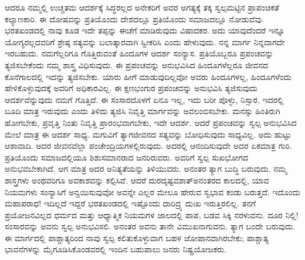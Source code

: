 ಆದರೂ ನಮ್ಮಲ್ಲಿ ಉಚ್ಚತಮ ಆದರ್ಶಕ್ಕೆ ಸಿದ್ಧರಲ್ಲದ ಅನೇಕರಿಗೆ ಅವರ ಅಗತ್ಯಕ್ಕೆ ತಕ್ಕ ಸ್ವಲ್ಪಮಟ್ಟಿನ ಪ್ರಾಪಂಚಿಕತೆ ಕಲ್ಯಾಣಕಾರಿ. ಈ ದೋಷವನ್ನು ಪ್ರತಿಯೊಂದು ದೇಶದಲ್ಲೂ ಪ್ರತಿಯೊಂದು ಸಮಾಜದಲ್ಲೂ ನೋಡುವೆವು. ಭರತಖಂಡದಲ್ಲಿ ನಾವು ಕೂಡ ಇದೇ ತಪ್ಪನ್ನು ಈಚೆಗೆ ಮಾಡಿರುವುದು ವಿಷಾದಕರ. ಅದು ಯಾವುದೆಂದರೆ ಇನ್ನೂ ಯೋಗ್ಯರಲ್ಲದವರಿಗೆ ಶ್ರೇಷ್ಠ ಸತ್ಯವನ್ನು ಬಲಾತ್ಕಾರವಾಗಿ ಸ್ವೀಕರಿಸಿ ಎಂದು ಹೇಳುವುದು. ನನ್ನ ಮಾರ್ಗ ನಿನ್ನದಾಗದೇ ಇರಬಹುದು. ನಮಗೆಲ್ಲರಿಗೂ ಗೊತ್ತಿರುವಂತೆ ಹಿಂದೂಗಳ ಆದರ್ಶ ಸಂನ್ಯಾಸ. ಪ್ರತಿಯೊಬ್ಬರೂ ಪ್ರಪಂಚವನ್ನು ತ್ಯಜಿಸಬೇಕೆಂದು ನಮ್ಮ ಶಾಸ್ತ್ರ ವಿಧಿಸುವುದು. ಈ ಪ್ರಪಂಚವನ್ನು ಅನುಭವಿಸಿದ ಹಿಂದೂಗಳೆಲ್ಲರೂ ಜೀವನದ ಕೊನೆಗಾಲದಲ್ಲಿ ಇದನ್ನು ತ್ಯಜಿಸಬೇಕು. ಯಾರು ಹೀಗೆ ಮಾಡುವುದಿಲ್ಲವೋ ಅವರು ಹಿಂದೂಗಳಲ್ಲ, ಹಿಂದೂಗಳೆಂದು ಹೇಳಿಕೊಳ್ಳುವುದಕ್ಕೆ ಅವರಿಗೆ ಅಧಿಕಾರವಿಲ್ಲ. ಈ ಕ್ಷಣಭಂಗುರ ಪ್ರಪಂಚವನ್ನು ಅನುಭವಿಸಿ ತ್ಯಜಿಸುವುದು ಆದರ್ಶವೆನ್ನುವುದು ನಮಗೆ ಗೊತ್ತಿದೆ. ಈ ಸಂಸಾರದೊಳಗೆ ಏನೂ ಇಲ್ಲ, ಇದು ಬರೀ ಪೊಳ್ಳು, ನಿಸ್ಸಾರ, ಇದರಲ್ಲಿ ಬೂದಿ ಮಾತ್ರ ಇರುವುದು ಎಂದು ತಿಳಿದು ತ್ಯಜಿಸಿ ನಿವೃತ್ತಿ ಮಾರ್ಗವನ್ನು ಅವಲಂಬಿಸಬೇಕು. ಮನಸ್ಸು ಹಿಂತಿರುಗಿ ಹೋಗಬೇಕು, ಪ್ರವೃತ್ತಿ ನಿಂತು ನಿವೃತ್ತಿ ಪ್ರಾರಂಭವಾಗಬೇಕು, ಇದೇ ಆದರ್ಶ. ಆದರೆ ಪ್ರಪಂಚವನ್ನು ಸ್ವಲ್ಪ ಅನುಭವಿಸಿದ ಮೇಲೆ ಮಾತ್ರ ಈ ಆದರ್ಶ ಸಾಧ್ಯ. ಮಗುವಿಗೆ ತ್ಯಾಗಜೀವನದ ಸತ್ಯವನ್ನು ಬೋಧಿಸುವುದು ಸಾಧ್ಯವಿಲ್ಲ. ಅದು ಹುಟ್ಟು ಆಶಾವಾದಿ. ಅದರ ಜೀವನವೆಲ್ಲಾ ಪಂಚೇಂದ್ರಿಯಗಳಲ್ಲಿರುವುದು. ಅದರಲ್ಲಿ ಆನಂದಿಸುವುದೇ ಅದರ ಏಕಮಾತ್ರ ಗುರಿ. ಪ್ರತಿಯೊಂದು ಸಮಾಜದಲ್ಲಿಯೂ ಶಿಶುಸಮಾನರಾದ ಜನರಿರುವರು. ಅವರಿಗೆ ಸ್ವಲ್ಪ ಸುಖಭೋಗದ ಅನುಭವಬೇಕಾಗಿದೆ. ಆಗ ಮಾತ್ರ ಅದರ ಅನಿತ್ಯತೆಯನ್ನು ತಿಳಿಯುವರು. ಅನಂತರ ತ್ಯಾಗ ಬುದ್ಧಿ ಬರುವುದು. ನಮ್ಮ ಶಾಸ್ತ್ರಗಳು ಅಂಥವರಿಗೂ ಅವಕಾಶವನ್ನು ಕಲ್ಪಿಸಿವೆ. ಆದರೆ ದುರದೃಷ್ಟವಶಾತ್​ ಅನಂತರದ ಕಾಲದಲ್ಲಿ, ಯಾವ ನಿಯಮಗಳು ಸಂನ್ಯಾಸಿಗೆ ಅನ್ವಯಿಸುವುವೋ ಅವನ್ನೇ ಎಲ್ಲರ ಮೇಲೂ ಹೇರುವ ಸ್ವಭಾವ ಕಂಡು ಬರುತ್ತದೆ. ಇದೊಂದು ಮಹಾಪರಾಧ! ಇದಿಲ್ಲದೆ ಇದ್ದರೆ ಭರತಖಂಡದಲ್ಲಿ ಇಷ್ಟೊಂದು ದಾರಿದ್ರ್ಯ ದುಃಖ ಇರುತ್ತಿರಲಿಲ್ಲ. ತನಗೆ ಪ್ರಯೋಜನವಿಲ್ಲದ ಧರ್ಮದ ಮತ್ತು ಆಧ್ಯಾತ್ಮಿಕ ನಿಯಮಗಳ ಜಾಲದಲ್ಲಿ ಪಾಪ, ಬಡವ ಸಿಕ್ಕಿ ನರಳುವನು. ದೂರ ನಿಲ್ಲಿ! ಸಂಸಾರವನ್ನು ಅವನು ಸ್ವಲ್ಪ ಅನುಭವಿಸಲಿ. ಅನಂತರ ಅವನು ತಾನೇ ವಿಮುಖನಾಗುವನು. ತ್ಯಾಗ ಬಂದೇ ಬರುವುದು. ಈ ಮಾರ್ಗದಲ್ಲಿ ಪಾಶ್ಚಾತ್ಯರಿಂದ ನಾವು ಸ್ವಲ್ಪ ಕಲಿತುಕೊಳ್ಳುವಾಗ ಬಹಳ ಜೋಪಾನವಾಗಿರಬೇಕು; ಪಾಶ್ಚಾತ್ಯ ಭಾವನೆಗಳನ್ನು ಮೈಗೂಡಿಸಿಕೊಂಡವರಲ್ಲಿ ಇಂದಿನ ಬಹುಪಾಲು ಜನರು ನಿಷ್ಪ್ರಯೋಜಕರು. 

